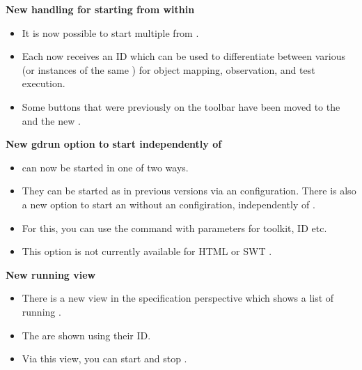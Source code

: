 \documentclass[en,a4paper,twoside,manual,guidancer]{bxreport}
\begin{document}
\textbf{New handling for starting \gdauts{} from within \gd{}}
\begin{itemize}
\item It is now possible to start multiple \gdauts{} from \gd{}. 
\item Each \gdaut{} now receives an ID which can be used to differentiate between various \gdauts{} (or instances of the same \gdaut{}) for object mapping, observation, and test execution. 
\item Some buttons that were previously on the toolbar have been moved to the \gdtestsuitebrowser{} and the new \gdrunautview{}. 
\end{itemize}

\textbf{New gdrun option to start \gdauts{} independently of \gd{}}
\begin{itemize}
\item \gdauts{} can now be started in one of two ways. 
\item They can be started as in previous versions via an \gdaut{} configuration. There is also a new option to start an \gdaut{} without an \gdaut{} configiration, independently of \gd{}. 
\item For this, you can use the command  with parameters for toolkit, \gdaut{} ID etc.
\item This option is not currently available for HTML or SWT \gdauts{}.
\end{itemize}

\textbf{New running \gdauts{} view}
\begin{itemize}
\item There is a new view in the specification perspective which shows a list of running \gdauts{}.
\item The \gdauts{} are shown using their ID.
\item Via this view, you can start \gdsuites{} and stop \gdauts{}.
\end{itemize}
\end{document}
